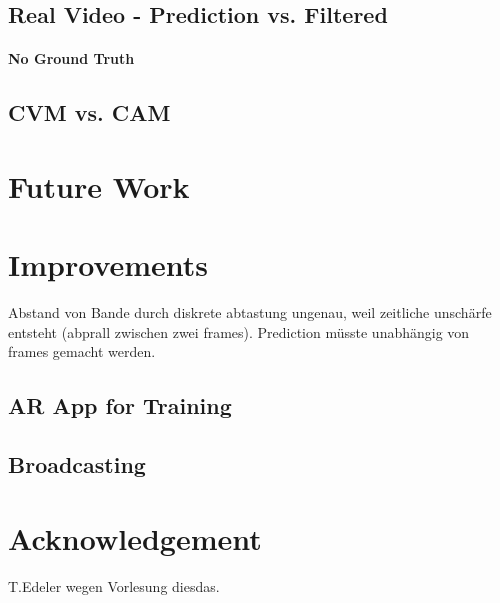 \documentclass[notitlepage, a4paper, 11pt]{scrartcl}
\begin{document}
\begin{multicols}{2}
\subsection{Real Video - Prediction vs. Filtered}
\paragraph{No Ground Truth}
\subsection{CVM vs. CAM}

\section{Future Work}

\section{Improvements}
Abstand von Bande durch diskrete abtastung ungenau, weil zeitliche unschärfe entsteht (abprall zwischen zwei frames).
Prediction müsste unabhängig von frames gemacht werden.


\subsection{AR App for Training}
\subsection{Broadcasting}

\section{Acknowledgement}

T.Edeler wegen Vorlesung diesdas.

\end{multicols}

 

\end{document}
